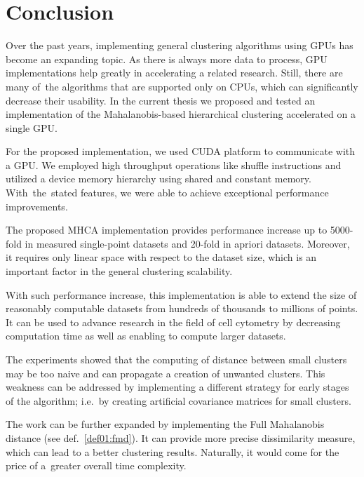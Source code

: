 \chapter*{Conclusion}

Over the past years, implementing general clustering algorithms using GPUs has become an expanding topic. As there is always more data to process, GPU implementations help greatly in accelerating a related research.  Still, there are many of~the algorithms that are supported only on CPUs, which can significantly decrease their usability. In the current thesis we proposed and tested an implementation of the Mahalanobis-based hierarchical clustering accelerated on a single GPU. 

For the proposed implementation, we used CUDA platform to communicate with a GPU. We employed high throughput operations like shuffle instructions and utilized a device memory hierarchy using shared and constant memory. With~the~stated features, we were able to achieve exceptional performance improvements.

The proposed MHCA implementation provides performance increase up to 5000-fold in measured single-point datasets and 20-fold in apriori datasets. Moreover, it requires only linear space with respect to the dataset size, which is an important factor in the general clustering scalability.

With such performance increase, this implementation is able to extend the size of reasonably computable datasets from hundreds of thousands to millions of points. It can be used to advance research in the field of cell cytometry by decreasing computation time as well as enabling to compute larger datasets.

The experiments showed that the computing of distance between small clusters may be too naive and can propagate a creation of unwanted clusters. This weakness can be addressed by implementing a different strategy for early stages of the algorithm; i.e.~by creating artificial covariance matrices for small clusters.

The work can be further expanded by implementing the Full Mahalanobis distance (see def.~\ref{def01:fmd}). It can provide more precise dissimilarity measure, which can lead to a better clustering results. Naturally, it would come for the price of a~greater overall time complexity. 